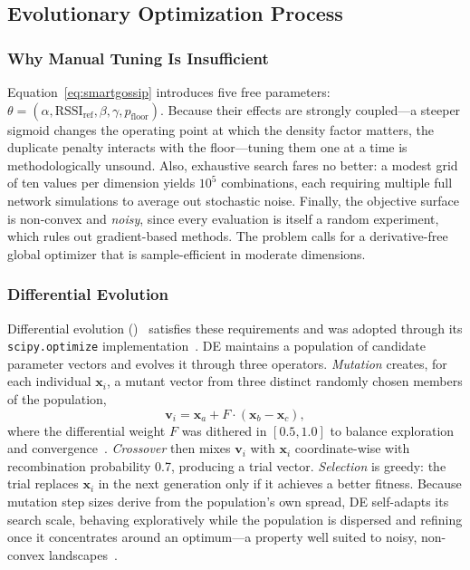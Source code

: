 \documentclass[english,bachelor]{tfgitic}[2026/01/22]
\begin{document}
\subsection{Evolutionary Optimization Process}
\label{sec:sim_optimization}

\subsubsection{Why Manual Tuning Is Insufficient}
 
Equation~\eqref{eq:smartgossip} introduces five free parameters: $\theta = (\alpha, \mathrm{RSSI}_{\text{ref}}, \beta, \gamma, p_{\text{floor}})$. Because their effects are strongly coupled---a steeper sigmoid changes the operating point at which the density factor matters, the duplicate penalty interacts with the floor---tuning them one at a time is methodologically unsound. Also, exhaustive search fares no better: a modest grid of ten values per dimension yields $10^5$ combinations, each requiring multiple full network simulations to average out stochastic noise. Finally, the objective surface is non-convex and \emph{noisy}, since every evaluation is itself a random experiment, which rules out gradient-based methods. The problem calls for a derivative-free global optimizer that is sample-efficient in moderate dimensions.
 
\subsubsection{Differential Evolution}
 
Differential evolution ()~\cite{storn1997de,price2005de} satisfies these requirements and was adopted through its \texttt{scipy.optimize} implementation~\cite{virtanen2020scipy}. DE maintains a population of candidate parameter vectors and evolves it through three operators. \emph{Mutation} creates, for each individual $\mathbf{x}_i$, a mutant vector from three distinct randomly chosen members of the population,
\begin{equation}
    \mathbf{v}_i = \mathbf{x}_a + F \cdot (\mathbf{x}_b - \mathbf{x}_c),
    \label{eq:de_mutation}
\end{equation}
where the differential weight $F$ was dithered in $[0.5, 1.0]$ to balance exploration and convergence~\cite{price2005de}. \emph{Crossover} then mixes $\mathbf{v}_i$ with $\mathbf{x}_i$ coordinate-wise with recombination probability 0.7, producing a trial vector. \emph{Selection} is greedy: the trial replaces $\mathbf{x}_i$ in the next generation only if it achieves a better fitness. Because mutation step sizes derive from the population's own spread, DE self-adapts its search scale, behaving exploratively while the population is dispersed and refining once it concentrates around an optimum---a property well suited to noisy, non-convex landscapes~\cite{das2011de}.
 
\end{document}
